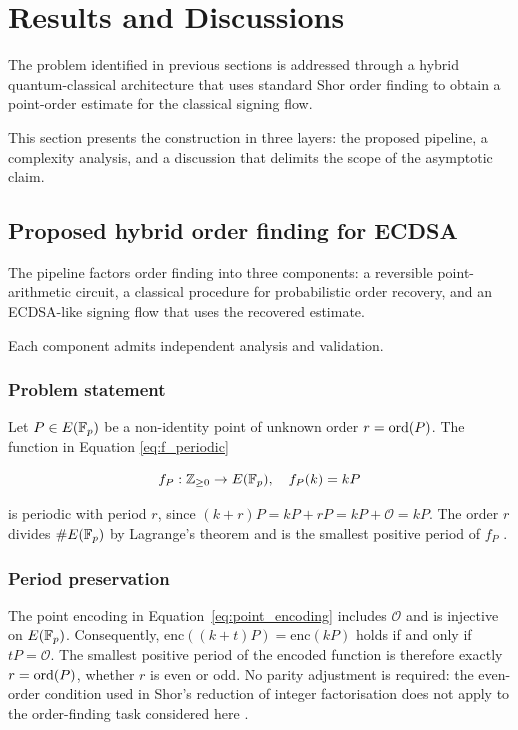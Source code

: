 \section{Results and Discussions}
\label{sec:results_discussions}

\begin{revision}

The problem identified in previous sections is addressed through a hybrid quantum-classical architecture that uses standard Shor order finding to obtain a point-order estimate for the classical signing flow. \end{revision}This section presents the construction in three layers: the proposed pipeline, a complexity analysis, and a discussion that delimits the scope of the asymptotic claim.

\subsection{Proposed hybrid order finding for ECDSA}

\begin{revision}
The pipeline factors order finding into three components: a reversible point-arithmetic circuit, a classical procedure for probabilistic order recovery, and an ECDSA-like signing flow that uses the recovered estimate.\end{revision} Each component admits independent analysis and validation.


\subsubsection{Problem statement}

Let $P \in E(\mathbb{F}_p)$ be a non-identity point of unknown order $r = \operatorname{ord}(P)$. The function in Equation \ref{eq:f_periodic}

\begin{equation}\label{eq:f_periodic}
    f_P : \mathbb{Z}_{\geq 0} \to E(\mathbb{F}_p), \quad f_P(k) = kP
\end{equation}

is periodic with period $r$, since $(k+r)P = kP + rP = kP + \mathcal{O} = kP$. The order $r$ divides $\#E(\mathbb{F}_p)$ by Lagrange's theorem and is the smallest positive period of $f_P$ \cite{Silverman2009}.


\begin{revision}

\subsubsection{{Period preservation}}
The point encoding in Equation~\eqref{eq:point_encoding} includes $\mathcal O$ and is injective on $E(\mathbb{F}_p)$. Consequently, $\mathrm{enc}((k+t)P)=\mathrm{enc}(kP)$ holds if and only if $tP=\mathcal O$. The smallest positive period of the encoded function is therefore exactly $r=\operatorname{ord}(P)$, whether $r$ is even or odd. No parity adjustment is required: the even-order condition used in Shor's reduction of integer factorisation does not apply to the order-finding task considered here \cite{Shor1997}.
\end{revision}

